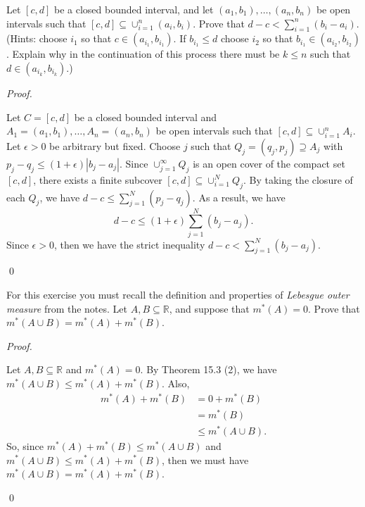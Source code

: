 \documentclass[12pt]{article}
\newenvironment{problem}[2][Problem]{\begin{trivlist}
\item[\hskip \labelsep {\bfseries #1}\hskip \labelsep {\bfseries
#2.}]}{\end{trivlist}}
\newenvironment{sol}
    {\emph{Proof.}
    }
    {
    \qed
    }
\begin{document}
  
  \begin{problem}{31}
  Let $[c,d]$ be a closed bounded interval, and let $(a_1,b_1),\dots,(a_n,b_n)$ be open intervals such that $[c,d] \subseteq \cup_{i = 1}^n(a_i,b_i)$. Prove that $d-c < \sum_{i = 1}^n(b_i - a_i)$. (Hints: choose $i_1$ so that $c \in (a_{i_1},b_{i_1})$. If $b_{i_1} \leq d$ choose $i_2$ so that $b_{i_1} \in (a_{i_2},b_{i_2})$. Explain why in the continuation of this process there must be $k \leq n$ such that $d \in (a_{i_k},b_{i_k})$.)
  \end{problem}
  \begin{sol}
  Let $C = [c,d]$ be a closed bounded interval and $A_1 = (a_1,b_1), \dots, A_n = (a_n, b_n)$ be open intervals such that $[c,d] \subseteq \cup_{i = 1}^nA_i$. Let $\epsilon > 0$ be arbitrary but fixed. Choose $j$ such that $Q_j = (q_j,p_j) \supseteq A_j$ with $p_j - q_j \leq (1 + \epsilon) \left| b_j - a_j \right|$. Since $\cup_{j = 1}^\infty Q_j$ is an open cover of the compact set $[c,d]$, there exists a finite subcover $[c,d] \subseteq \cup_{i = 1}^N Q_j$. By taking the closure of each $Q_j$, we have $d - c \leq \sum_{j = 1}^N (p_j - q_j)$. As a result, we have $$d - c \leq (1 + \epsilon)\sum_{j = 1}^N(b_j - a_j).$$ Since $\epsilon > 0$, then we have the strict inequality $d - c < \sum_{j = 1}^N(b_j - a_j)$.
  \end{sol}
  
  
  \begin{problem}{32}
  For this exercise you must recall the definition and properties of \textit{Lebesgue outer measure} from the notes. Let $A,B \subseteq \mathbb{R}$, and suppose that $m^*(A) = 0$. Prove that $m^*(A \cup B) = m^*(A) + m^*(B)$.
  \end{problem}
  \begin{sol}
  Let $A,B \subseteq \mathbb{R}$ and $m^*(A) = 0$. By Theorem 15.3 (2), we have $m^*(A \cup B) \leq m^*(A) + m^*(B)$. Also, \begin{align*}
      m^*(A) + m^*(B) &= 0 + m^*(B) \tag*{(By monotonicity of the outer measure)} \\ &= m^*(B) \\ &\leq m^*(A \cup B). 
  \end{align*}
  So, since $m^*(A) + m^*(B) \leq m^*(A \cup B)$ and $m^*(A \cup B) \leq m^*(A) + m^*(B)$, then we must have $m^*(A \cup B) = m^*(A) + m^*(B)$.
  \end{sol}
\end{document}
